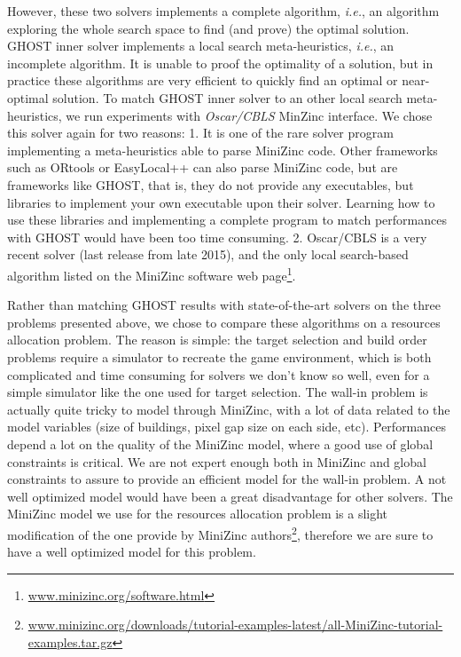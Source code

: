 \documentclass[journal]{IEEEtran}
\newcommand{\ghost}{\textsc{GHOST}\xspace}
\newcommand{\ie}{\textit{i.e.}}
\begin{document}
{However, these  two solvers implements  a complete algorithm,  \ie, an
algorithm exploring  the whole  search space to  find (and  prove) the
optimal  solution.   \ghost inner  solver  implements  a local  search
meta-heuristics, \ie, an  incomplete algorithm. It is  unable to proof
the optimality  of a  solution, but in  practice these  algorithms are
very efficient to quickly find an optimal or near-optimal solution. To
match \ghost inner solver to an other local search meta-heuristics, we
run experiments  with {\it  Oscar/CBLS} MinZinc interface.   We chose
this solver  again for two  reasons: 1. It is  one of the  rare solver
program  implementing   a  meta-heuristics  able  to   parse  MiniZinc
code. Other frameworks such as  ORtools or EasyLocal++ can also parse
MiniZinc code,  but are frameworks like  \ghost, that is, they  do not
provide  any   executables,  but  libraries  to   implement  your  own
executable upon their solver.  Learning how to use these libraries and
implementing  a complete  program  to match  performances with  \ghost
would have been  too time consuming.  2.  Oscar/CBLS is  a very recent
solver (last release from late  2015), and the only local search-based
algorithm     listed     on      the     MiniZinc     software     web
page\footnote{\href{http://www.minizinc.org/software.html}{www.minizinc.org/software.html}}.

Rather than  matching \ghost results with  state-of-the-art solvers on
the  three  problems  presented  above, we  chose  to  compare  these
algorithms on  a resources allocation  problem. The reason  is simple:
the target selection  and build order problems require  a simulator to
recreate  the game  environment, which  is both  complicated and  time
consuming  for solvers  we  don't  know so  well,  even  for a  simple
simulator like the one used  for target selection. The wall-in problem
is actually quite tricky to model through MiniZinc, with a lot of data
related to the  model variables (size of buildings, pixel  gap size on
each side,  etc).  Performances  depend a  lot on  the quality  of the
MiniZinc model, where a good use of global constraints is critical. We
are  not expert  enough both  in  MiniZinc and  global constraints  to
assure to provide  an efficient model for the wall-in  problem.  A not
well optimized  model would have  been a great disadvantage  for other
solvers.   The MiniZinc  model  we use  for  the resources  allocation
problem  is a  slight  modification  of the  one  provide by  MiniZinc
authors\footnote{\href{http://www.minizinc.org/downloads/tutorial-examples-latest/all-MiniZinc-tutorial-examples.tar.gz}{www.minizinc.org/downloads/tutorial-examples-latest/all-MiniZinc-tutorial-examples.tar.gz}},
therefore we are sure to have a well optimized model for this problem.

}
\end{document}
